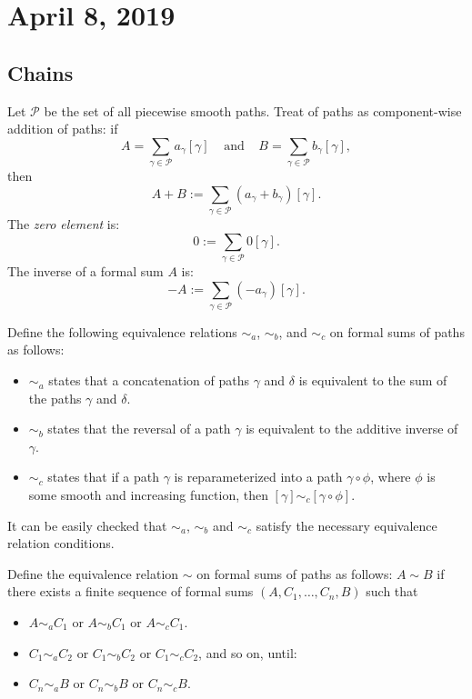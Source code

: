 \section{April 8, 2019}

\subsection{Chains}
Let $\mathscr{P}$ be the set of all piecewise smooth paths.
Treat  of paths as component-wise addition of paths: if 
\[ A = \sum_{\gamma \in \mathscr{P}} a_{\gamma} [\gamma] 
\;\;\;\; \text{and} \;\;\;\; B = \sum_{\gamma \in \mathscr{P}} b_{\gamma} [\gamma], \]
then
\[ A+B := \sum_{\gamma \in \mathscr{P}} (a_{\gamma} + b_{\gamma})
[\gamma]. \]
The \textit{zero element} is:
\[ 0 := \sum_{\gamma \in \mathscr{P}} 0[\gamma]. \]
The inverse of a formal sum $A$ is:
\[ -A := \sum_{\gamma \in \mathscr{P}} (-a_{\gamma}) [\gamma]. \]

\begin{definition}
    Define the following equivalence relations ${\sim}_{a}$, ${\sim}_{b}$, and ${\sim}_{c}$ on formal sums of paths
    as follows:
    \begin{itemize}
        \item ${\sim}_{a}$ states that 
            a concatenation of paths $\gamma$ and $\delta$ is equivalent
            to the sum of the paths $\gamma$ and $\delta$. %
        \item ${\sim}_{b}$ states that the reversal
            of a path $\gamma$ is equivalent to the additive inverse of $\gamma$.
        \item ${\sim}_{c}$ states that if a path
            $\gamma$ is reparameterized into a path $\gamma 
            \circ \phi$, where $\phi$ is some smooth and increasing
            function, then $[\gamma] {\sim}_{c} 
            [\gamma \circ \phi]$. 
    \end{itemize}
\end{definition}

It can be easily checked that $\sim_a$, $\sim_b $ and $\sim_c$
satisfy the necessary equivalence relation conditions.

\begin{definition}
    Define the equivalence relation $\sim$ on formal sums of paths
    as follows:
    $A \sim B$ if there exists a finite sequence of formal sums
    $(A, C_1, \ldots, C_n, B)$ such that
    \begin{itemize}
        \item $A \sim_a C_1$ or $A \sim_b C_1$ or $A \sim_c C_1$.
        \item $C_1 \sim_a C_2$ or $C_1 \sim_b C_2$ or $C_1 \sim_c C_2$, and so on, until:
        \item $C_n \sim_a B$ or $C_n \sim_b B$ or $C_n \sim_c B$.
    \end{itemize}
   
\end{definition}

